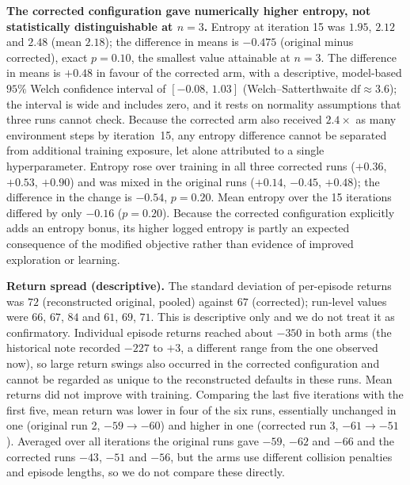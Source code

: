 \documentclass[12pt]{article}
\begin{document}
\textbf{The corrected configuration gave numerically higher entropy, not statistically distinguishable at $n=3$.}
Entropy at iteration 15 was $1.95$, $2.12$ and $2.48$ (mean $2.18$); the
difference in means is $-0.475$ (original minus corrected), exact $p=0.10$,
the smallest value attainable at $n=3$. The difference in means is $+0.48$ in favour of the corrected arm, with a descriptive, model-based $95\%$ Welch confidence interval of $[-0.08,\,1.03]$ (Welch--Satterthwaite $\mathrm{df}\approx3.6$); the interval is wide and includes zero, and it rests on normality assumptions that three runs cannot check. Because the corrected arm also received $2.4\times$ as many environment steps by iteration~15, any entropy difference cannot be separated from additional training exposure, let alone attributed to a single hyperparameter. Entropy rose over training in all
three corrected runs ($+0.36$, $+0.53$, $+0.90$) and was mixed in the
original runs ($+0.14$, $-0.45$, $+0.48$); the difference in the change is
$-0.54$, $p=0.20$. Mean entropy over the 15 iterations differed by only
$-0.16$ ($p=0.20$). Because the corrected configuration explicitly adds an entropy bonus, its higher logged entropy is partly an expected consequence of the modified objective rather than evidence of improved exploration or learning.

\textbf{Return spread (descriptive).} The standard deviation of per-episode
returns was $72$ (reconstructed original, pooled) against $67$ (corrected); run-level
values were $66$, $67$, $84$ and $61$, $69$, $71$. This is descriptive only and we do not treat it as confirmatory. Individual
episode returns reached about $-350$ in both arms (the historical note recorded $-227$ to $+3$, a different range from the one observed now), so large return swings also occurred in the corrected configuration and cannot be regarded as unique to the reconstructed defaults in these runs. Mean returns
did not improve with training. Comparing the last five iterations with the
first five, mean return was lower in four of the six runs, essentially
unchanged in one (original run 2, $-59\to-60$) and higher in one (corrected
run 3, $-61\to-51$). Averaged over all iterations the original runs gave
$-59$, $-62$ and $-66$ and the corrected runs $-43$, $-51$ and $-56$, but the
arms use different collision penalties and episode lengths, so we do not
compare these directly.
\end{document}

